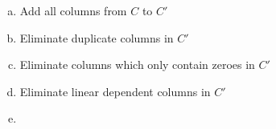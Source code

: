 
\begin{enumerate}[(a)]

\item Add all columns from $C$ to $C'$

\item Eliminate duplicate columns in $C'$

\item Eliminate columns which only contain zeroes in $C'$

\item Eliminate linear dependent columns in $C'$

\item {}

\end{enumerate}


